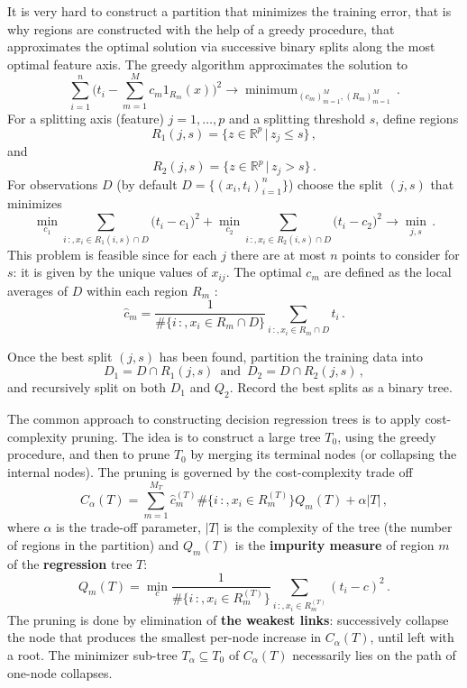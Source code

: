 \documentclass[a4paper]{article}
\newcommand{\Real}{\mathbb{R}}
\begin{document}
It is very hard to construct a partition that minimizes the training error, that is
why regions are constructed with the help of a greedy procedure, that approximates
the optimal solution via successive binary splits along the most optimal feature
axis. The greedy algorithm approximates the solution to
\[
\sum_{i=1}^n \bigl( t_i - \sum_{m=1}^M c_m 1_{R_m}(x) \bigr)^2
\to \mathop{\text{minimum}}_{(c_m)_{m=1}^M, (R_m)_{m=1}^M}\,.
\]
For a splitting axis (feature) $j=1,\ldots,p$ and a splitting threshold $s$, define
regions
\[ R_1(j,s) = \bigr\{ z \in \Real^p\,\big|\, z_j \leq s \bigr\} \,, \]
and
\[ R_2(j,s) = \bigr\{ z \in \Real^p\,\big|\, z_j > s \bigr\} \,. \]
For observations $D$ (by default $D = \{(x_i,t_i)_{i=1}^n\}$) choose the split
$(j,s)$ that minimizes
\[ 
  \min_{c_1} \sum_{i\,:,x_i\in R_1(i,s)\cap D} \bigl( t_i - c_1 \bigr)^2
+ \min_{c_2} \sum_{i\,:,x_i\in R_2(i,s)\cap D} \bigl( t_i - c_2 \bigr)^2
\to \min_{j,s}\,.
\]
This problem is feasible since for each $j$ there are at most $n$ points to consider
for $s$: it is given by the unique values of $x_{ij}$. The optimal $c_m$ are defined
as the local averages of $D$ within each region $R_m$ :
\[ \hat{c}_m = \frac{1}{\#\{i\,:,x_i\in R_m \cap D\}} \sum_{i\,:,x_i\in R_m \cap D} t_i \,. \]

Once the best split $(j,s)$ has been found, partition the training data into
\[ D_1 = D \cap R_1(j,s)\,\text{ and }\, D_2 = D \cap R_2(j,s)\,, \]
and recursively split on both $D_1$ and $Q_2$. Record the best splits as a binary
tree.

The common approach to constructing decision regression trees is to apply cost-complexity
pruning. The idea is to construct a large tree $T_0$, using the greedy procedure,
and then to prune $T_0$ by merging its terminal nodes (or collapsing the internal
nodes). The pruning is governed by the cost-complexity trade off
\[ C_\alpha(T) = \sum_{m=1}^{M_T} \hat{c}^{(T)}_m \#\{i\,:,x_i\in R^{(T)}_m\} Q_m(T) + \alpha |T|\,, \]
where $\alpha$ is the trade-off parameter, $|T|$ is the complexity of the tree (the
number of regions in the partition) and $Q_m(T)$ is the \textbf{impurity measure}
of region $m$ of the \textbf{regression} tree $T$:
\[
Q_m(T) = \min_c \frac{1}{\#\{i\,:,x_i\in R^{(T)}_m\}} \sum_{i\,:,x_i\in R^{(T)}_m} ( t_i - c )^2 \,.
\]
The pruning is done by elimination of \textbf{the weakest links}: successively collapse
the node that produces the smallest per-node increase in $C_\alpha(T)$, until left with
a root. The minimizer sub-tree $T_\alpha\subseteq T_0$ of $C_\alpha(T)$ necessarily lies
on the path of one-node collapses.
\end{document}
